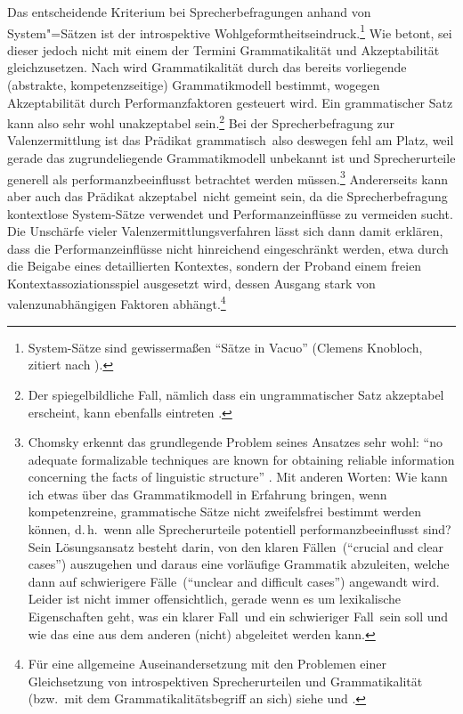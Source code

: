 Das entscheidende Kriterium bei Sprecherbefragungen anhand von System"=Sätzen ist der introspektive Wohlgeformtheitseindruck.\footnote{System-Sätze sind gewisserma\ss en "`Sätze in Vacuo"' (Clemens Knobloch, zitiert nach \citealt[12]{Ortner:87}).} Wie \cite{Storrer:92} betont, sei dieser jedoch nicht mit einem der Termini Grammatikalität und Akzeptabilität gleichzusetzen. Nach \cite{Chomsky:65} wird Grammatikalität durch das bereits vorliegende (abstrakte, kompetenzseitige) Grammatikmodell bestimmt, wogegen Akzeptabilität durch Performanzfaktoren gesteuert wird. Ein grammatischer Satz kann also sehr wohl unakzeptabel sein.\footnote{Der spiegelbildliche Fall, nämlich dass ein ungrammatischer Satz akzeptabel erscheint, kann ebenfalls eintreten \citep{Frazier:85,Gibson:Thomas:99}.} Bei der Sprecherbefragung zur Valenzermittlung ist das Prädikat \glq grammatisch\grq\ also deswegen fehl am Platz, weil gerade das zugrundeliegende Grammatikmodell unbekannt ist und Sprecherurteile generell als performanzbeeinflusst betrachtet werden müssen.\footnote{Chomsky erkennt das grundlegende Problem seines Ansatzes sehr wohl: "`no adequate formalizable techniques are known for obtaining reliable information concerning the facts of linguistic structure"' \citep[19]{Chomsky:65}. Mit anderen Worten: Wie kann ich etwas über das Grammatikmodell in Erfahrung bringen, wenn kompetenzreine, grammatische Sätze nicht zweifelsfrei bestimmt werden können, d.\,h.\ wenn alle Sprecherurteile potentiell performanzbeeinflusst sind? Sein Lösungsansatz besteht darin, von den \glqq klaren Fällen\grqq\ ("`crucial and clear cases"') auszugehen und daraus eine vorläufige Grammatik abzuleiten, welche dann auf \glqq schwierigere Fälle\grqq\ ("`unclear and difficult cases"') angewandt wird. Leider ist nicht immer offensichtlich, gerade wenn es um lexikalische Eigenschaften geht, was ein \glqq klarer Fall\grqq\ und ein \glqq schwieriger Fall\grqq\ sein soll und wie das eine aus dem anderen (nicht) abgeleitet werden kann.} Andererseits kann aber auch das Prädikat \glq akzeptabel\grq\ nicht gemeint sein, da die Sprecherbefragung kontextlose System-Sät\-ze verwendet und Performanzeinflüsse zu vermeiden sucht. Die Unschärfe vieler Valenzermittlungsverfahren lässt sich dann damit erklären, dass die Performanzeinflüsse nicht hinreichend eingeschränkt werden, etwa durch die Beigabe eines detaillierten Kontextes, sondern der Proband einem freien Kontextassoziationsspiel ausgesetzt wird, dessen Ausgang stark von valenzunabhängigen Faktoren abhängt.\footnote{Für eine allgemeine Auseinandersetzung mit den Problemen einer Gleichsetzung von introspektiven Sprecherurteilen und Grammatikalität (bzw.\ mit dem Grammatikalitätsbegriff an sich) siehe \cite{Schuetze:96} und \cite{Sampson:07}.}

